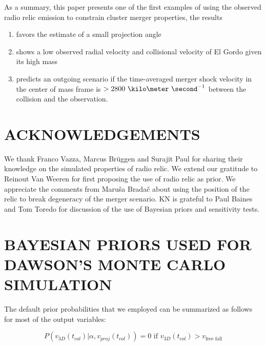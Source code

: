 As a summary, this paper presents one of the first examples of using the
observed radio relic emission to constrain cluster merger properties, the
results
\begin{enumerate}
\item favors the estimate of a small projection angle \\ 
\item shows a low observed radial velocity and collisional velocity of El
	Gordo given its high mass \\ 
\item predicts an outgoing scenario if the time-averaged merger shock
	velocity in the center of mass frame is $> 2800~\kilo \meter~\second^{-1}$ between the collision and the
observation. 
\end{enumerate}

\section{ACKNOWLEDGEMENTS}
We thank Franco Vazza, Marcus Br\"{u}ggen and Surajit Paul for sharing
their knowledge on the simulated properties of radio relic. We
extend our gratitude to Reinout Van Weeren for first proposing the use of
radio relic as prior. We appreciate the comments from Maru\v{s}a
Brada\v{c} about using the position of the relic to break degeneracy
of the merger scenario. KN is grateful to Paul Baines and Tom Toredo for
discussion of the use of Bayesian priors and sensitivity tests. 





\appendix

\section{BAYESIAN PRIORS USED FOR DAWSON'S MONTE CARLO SIMULATION}
\label{app:priors}
%
The default prior probabilities that we employed can be summarized as
follows for most of the output variables: 

\begin{equation}
	P(v_{3D}(t_{col}) | \alpha, v_{proj}(t_{col})) = 0\text{ if }v_{3D}(t_{col}) >
	v_{\text{free fall}} 
\end{equation}


